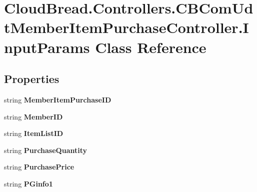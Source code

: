 \hypertarget{a00112}{}\section{Cloud\+Bread.\+Controllers.\+C\+B\+Com\+Udt\+Member\+Item\+Purchase\+Controller.\+Input\+Params Class Reference}
\label{a00112}
\subsection*{Properties}
\begin{DoxyCompactItemize}
\item 
string {\bfseries Member\+Item\+Purchase\+ID}\hypertarget{a00112_a121d4892ecb9a3cb53cfa2ecfc23dba7}{}\label{a00112_a121d4892ecb9a3cb53cfa2ecfc23dba7}

\item 
string {\bfseries Member\+ID}\hypertarget{a00112_a62e057ae63f073edd6811d68856e2a61}{}\label{a00112_a62e057ae63f073edd6811d68856e2a61}

\item 
string {\bfseries Item\+List\+ID}\hypertarget{a00112_a65289101768b54a287be03ba1d332080}{}\label{a00112_a65289101768b54a287be03ba1d332080}

\item 
string {\bfseries Purchase\+Quantity}\hypertarget{a00112_ae0d65333443ab8657e2b215191a95a1e}{}\label{a00112_ae0d65333443ab8657e2b215191a95a1e}

\item 
string {\bfseries Purchase\+Price}\hypertarget{a00112_a93b990599dd4815e9d009ebbaedcdae2}{}\label{a00112_a93b990599dd4815e9d009ebbaedcdae2}

\item 
string {\bfseries P\+Ginfo1}\hypertarget{a00112_a455d55c96c45ad2520f21af1367f7c37}{}\label{a00112_a455d55c96c45ad2520f21af1367f7c37}


\end{DoxyCompactItemize}
